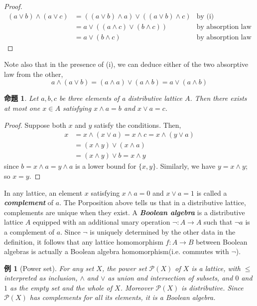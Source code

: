 \documentclass[a4j,12pt]{jarticle}
\numberwithin{equation}{section}
\newtheorem{example}{例}[section]
\newcommand{\itbf}[1]{\textit{\textbf{#1}}}
\newtheorem{prop}[thm]{命題}
\begin{document}
\begin{proof}
  \begin{align*}
    (a \vee b) \wedge (a \vee c) &= ((a \vee b) \wedge a) \vee ((a \vee b) \wedge c) &\text{by (i)}\\
                                 &= a \vee ((a \wedge c) \vee (b \wedge c)) &\text{by absorption law}\\
                                 &= a \vee (b \wedge c) &\text{by absorption law}
  \end{align*}
\end{proof}
Note also that in the presence of (i), we can deduce either of the two absorptive law from the other,
\begin{equation}
  a \wedge (a \vee b) = (a \wedge a) \vee (a \wedge b) = a \vee (a \wedge b)
\end{equation}
\begin{prop}
  Let $a,b,c$ be three elements of a distributive lattice $A$. Then there exists at most one $x \in A$ satisfying $x \wedge a = b$ and $x \vee a = c$.
\end{prop}
\begin{proof}
  Suppose both $x$ and $y$ satisfy the conditions. Then,
  \begin{align*}
    x &= x \wedge (x \vee a) = x \wedge c = x \wedge (y \vee a) \\
      &= (x \wedge y) \vee (x \wedge a)\\
      &= (x \wedge y) \vee b = x \wedge y
  \end{align*}
  since $b = x \wedge a = y \wedge a$ is a lower bound for $\{x,y\}$. Similarly, we have $y = x \wedge y$; so $x=y$.
\end{proof}
In any lattice, an element $x$ satisfying $x\wedge a = 0$ and $x \vee a = 1$ is called a \itbf{complement} of $a$.
The Porposition above tells us that in a distributive lattice, complements are unique when they exist.
A \itbf{Boolean algebra} is a distributive lattice $A$ equipped with an additional unary operation $\neg :A \rightarrow A$ such that $\neg a$ is a complement of $a$.
Since $\neg$ is uniquely determined by the other data in the definition, it follows that any lattice homomorphism $f:A\rightarrow B$ between Boolean algebras is actually a Boolean algebra homomorphism(i.e. commutes with $\neg$).
\begin{example}[Power set]
  For any set $X$, the power set $\mathcal{P}(X)$ of $X$ is a lattice, with $\le$ interpreted as inclusion, $\wedge$ and $\vee$ as union and intersection of subsets, and $0$ and $1$ as the empty set and the whole of $X$. Moreover $\mathcal{P}(X)$ is distributive. Since $\mathcal{P}(X)$ has complements for all its elements, it is a Boolean algebra.
\end{example}
\end{document}

